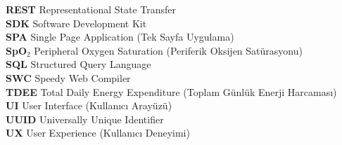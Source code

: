 \begin{tabbing}
\textbf{REST}     \> Representational State Transfer \\[4pt]
\textbf{SDK}      \> Software Development Kit \\[4pt]
\textbf{SPA}      \> Single Page Application (Tek Sayfa Uygulama) \\[4pt]
\textbf{SpO$_2$}  \> Peripheral Oxygen Saturation (Periferik Oksijen Satürasyonu) \\[4pt]
\textbf{SQL}      \> Structured Query Language \\[4pt]
\textbf{SWC}      \> Speedy Web Compiler \\[4pt]
\textbf{TDEE}     \> Total Daily Energy Expenditure (Toplam Günlük Enerji Harcaması) \\[4pt]
\textbf{UI}       \> User Interface (Kullanıcı Arayüzü) \\[4pt]
\textbf{UUID}     \> Universally Unique Identifier \\[4pt]
\textbf{UX}       \> User Experience (Kullanıcı Deneyimi) \\[4pt]
\end{tabbing}
